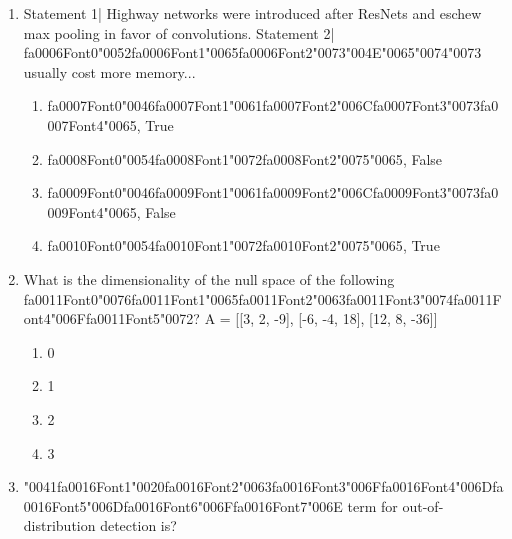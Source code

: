 \documentclass[{\csname fa0013Font0\endcsname\char"0033}{\csname fa0014Font0\endcsname\char"0034}pt]{article}
\begin{document}
\begin{enumerate}[label=\arabic*.]
\begin{enumerate}[label=(\alph*)]
\end{enumerate}
\item Statement 1| Highway networks were introduced after ResNets and eschew max pooling in favor of convolutions. Statement 2| {\csname fa0006Font0\endcsname\char"0052}{\csname fa0006Font1\endcsname\char"0065}{\csname fa0006Font2\endcsname\char"0073}{\char"004E}{\char"0065}{\char"0074}{\char"0073} usually cost more memory...
\begin{enumerate}[label=(\alph*)]
    \item {\csname fa0007Font0\endcsname\char"0046}{\csname fa0007Font1\endcsname\char"0061}{\csname fa0007Font2\endcsname\char"006C}{\csname fa0007Font3\endcsname\char"0073}{\csname fa0007Font4\endcsname\char"0065}, True
    \item {\csname fa0008Font0\endcsname\char"0054}{\csname fa0008Font1\endcsname\char"0072}{\csname fa0008Font2\endcsname\char"0075}{\char"0065}, False
    \item {\csname fa0009Font0\endcsname\char"0046}{\csname fa0009Font1\endcsname\char"0061}{\csname fa0009Font2\endcsname\char"006C}{\csname fa0009Font3\endcsname\char"0073}{\csname fa0009Font4\endcsname\char"0065}, False
    \item {\csname fa0010Font0\endcsname\char"0054}{\csname fa0010Font1\endcsname\char"0072}{\csname fa0010Font2\endcsname\char"0075}{\char"0065}, True
\end{enumerate}
\item What is the dimensionality of the null space of the following {\csname fa0011Font0\endcsname\char"0076}{\csname fa0011Font1\endcsname\char"0065}{\csname fa0011Font2\endcsname\char"0063}{\csname fa0011Font3\endcsname\char"0074}{\csname fa0011Font4\endcsname\char"006F}{\csname fa0011Font5\endcsname\char"0072}? A = [[3, 2, -9], [-6, -4, 18], [12, 8, -36]]
\begin{enumerate}[label=(\alph*)]
    \item 0
    \item 1
    \item 2
    \item 3
\end{enumerate}
\item {\char"0041}{\csname fa0016Font1\endcsname\char"0020}{\csname fa0016Font2\endcsname\char"0063}{\csname fa0016Font3\endcsname\char"006F}{\csname fa0016Font4\endcsname\char"006D}{\csname fa0016Font5\endcsname\char"006D}{\csname fa0016Font6\endcsname\char"006F}{\csname fa0016Font7\endcsname\char"006E} term for out-of-distribution detection is?
\begin{enumerate}[label=(\alph*)]

\end{enumerate}
\end{enumerate}
\end{document}
